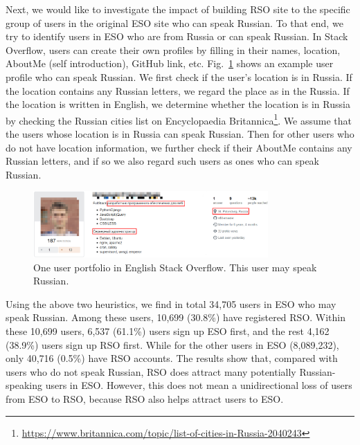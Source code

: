 Next, we would like to investigate the impact of building RSO site to the specific group of users in the original ESO site who can speak Russian.
To that end, we try to identify users in ESO who are from Russia or can speak Russian.
In Stack Overflow, users can create their own profiles by filling in their names, location, AboutMe (self introduction), GitHub link, etc.
Fig.~\ref{fig:userportfolio} shows an example user profile who can speak Russian.
We first check if the user's location is in Russia.
If the location contains any Russian letters, we regard the place as in the Russia.
If the location is written in English, we determine whether the location is in Russia by checking the Russian cities list on Encyclopaedia Britannica\footnote{\url{https://www.britannica.com/topic/list-of-cities-in-Russia-2040243}}.
We assume that the users whose location is in Russia can speak Russian.
Then for other users who do not have location information, we further check if their AboutMe contains any Russian letters, and if so we also regard such users as ones who can speak Russian.

\begin{figure}
	\centering
	\includegraphics[width = 0.8\textwidth]{figures/userportfolio.png}
	\caption{One user portfolio in English Stack Overflow. This user may speak Russian.}
	\centering
	\label{fig:userportfolio}
\end{figure}

Using the above two heuristics, we find in total 34,705 users in ESO who may speak Russian.
Among these users, 10,699 (30.8\%) have registered RSO.
Within these 10,699 users, 6,537 (61.1\%) users sign up ESO first, and the rest 4,162 (38.9\%) users sign up RSO first.
While for the other users in ESO (8,089,232), only 40,716 (0.5\%) have RSO accounts.
The results show that, compared with users who do not speak Russian, RSO does attract many potentially Russian-speaking users in ESO. 
However, this does not mean a unidirectional loss of users from ESO to RSO, because RSO also helps attract users to ESO.
  

